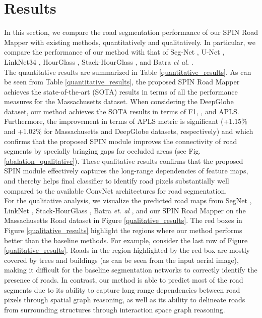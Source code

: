 \documentclass[letterpaper, 10 pt, conference]{ieeeconf}
\begin{document}
\section{Results}
In this section, we compare the road segmentation performance of our SPIN Road Mapper with existing methods, quantitatively and qualitatively.  In particular, we compare the performance of our method with that of Seg-Net \cite{badrinarayanan2017segnet}, U-Net \cite{ronneberger2015u}, LinkNet34 \cite{chaurasia2017linknet}, HourGlass \cite{newell2016stacked}, Stack-HourGlass \cite{newell2016stacked}, and Batra \textit{et al.} \cite{batra2019improved}.\\
 The quantitative results are summarized in Table \ref{quantitative_results}. As can be seen from Table \ref{quantitative_results}, the proposed SPIN Road Mapper achieves the state-of-the-art (SOTA) results in terms of all the performance measures for the Massachusetts dataset. When considering the DeepGlobe dataset, our method achieves the SOTA results in terms of F1, , and APLS. Furthermore, the improvement in terms of APLS metric is significant (+1.15\% and +1.02\% for Massachusetts and DeepGlobe datasets, respectively) and which confirms that the proposed SPIN module improves the connectivity of road segments by specially bringing gaps for occluded areas (see Fig. \ref{abalation_qualitative}). These qualitative results confirms that the proposed SPIN module effectively captures the long-range dependencies of feature maps, and thereby helps final classifier to identify road pixels substantially well compared to the available ConvNet architectures for road segmentation.\\
 For the qualitative analysis, we visualize the predicted road maps from SegNet \cite{badrinarayanan2017segnet}, LinkNet \cite{chaurasia2017linknet}, Stack-HourGlass \cite{demir2018deepglobe}, Batra \textit{et. al} \cite{batra2019improved}, and our SPIN Road Mapper on the Massachusetts Road dataset in Figure \ref{qualitative_results}. The red boxes in Figure \ref{qualitative_results} highlight the regions where our method performs better than the baseline methods. For example, consider the last row of Figure \ref{qualitative_results}. Roads in the region highlighted by the red box are mostly covered by trees and buildings (as can be seen from the input aerial image), making it difficult for the baseline segmentation networks to correctly identify the presence of roads. In contrast, our method is able to predict most of the road segments due to its ability to capture long-range dependencies between road pixels through spatial graph reasoning, as well as its ability to delineate roads from surrounding structures through interaction space graph reasoning.\\
\end{document}
